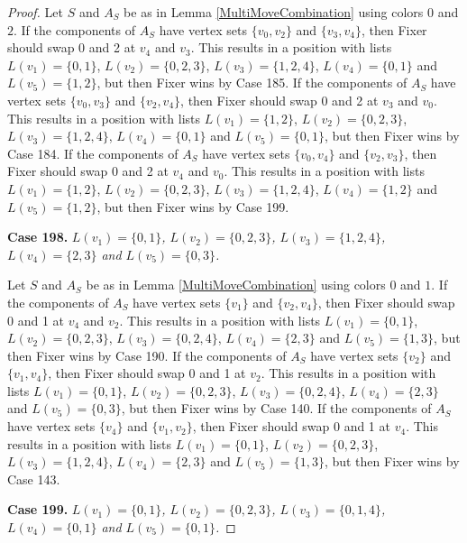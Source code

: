 \documentclass[12pt]{amsart}
\theoremstyle{plain}
\theoremstyle{definition}
\theoremstyle{remark}
\begin{document}
\begin{proof}
Let $S$ and $A_S$ be as in Lemma \ref{MultiMoveCombination} using colors $0$ and $2$. If the components of $A_S$ have vertex sets $\{v_0, v_2\}$ and $\{v_3, v_4\}$, then Fixer should swap 0 and 2 at $v_4$ and $v_3$. This results in a position with lists $L(v_1) = \{0, 1\}$, $L(v_2) = \{0, 2, 3\}$, $L(v_3) = \{1, 2, 4\}$, $L(v_4) = \{0, 1\}$ and $L(v_5) = \{1, 2\}$, but then Fixer wins by Case 185.
If the components of $A_S$ have vertex sets $\{v_0, v_3\}$ and $\{v_2, v_4\}$, then Fixer should swap 0 and 2 at $v_3$ and $v_0$. This results in a position with lists $L(v_1) = \{1, 2\}$, $L(v_2) = \{0, 2, 3\}$, $L(v_3) = \{1, 2, 4\}$, $L(v_4) = \{0, 1\}$ and $L(v_5) = \{0, 1\}$, but then Fixer wins by Case 184.
If the components of $A_S$ have vertex sets $\{v_0, v_4\}$ and $\{v_2, v_3\}$, then Fixer should swap 0 and 2 at $v_4$ and $v_0$. This results in a position with lists $L(v_1) = \{1, 2\}$, $L(v_2) = \{0, 2, 3\}$, $L(v_3) = \{1, 2, 4\}$, $L(v_4) = \{1, 2\}$ and $L(v_5) = \{1, 2\}$, but then Fixer wins by Case 199.

\noindent\textbf{Case 198.  }\textit{$L(v_1) = \{0, 1\}$, $L(v_2) = \{0, 2, 3\}$, $L(v_3) = \{1, 2, 4\}$, $L(v_4) = \{2, 3\}$ and $L(v_5) = \{0, 3\}$.}

Let $S$ and $A_S$ be as in Lemma \ref{MultiMoveCombination} using colors $0$ and $1$. If the components of $A_S$ have vertex sets $\{v_1\}$ and $\{v_2, v_4\}$, then Fixer should swap 0 and 1 at $v_4$ and $v_2$. This results in a position with lists $L(v_1) = \{0, 1\}$, $L(v_2) = \{0, 2, 3\}$, $L(v_3) = \{0, 2, 4\}$, $L(v_4) = \{2, 3\}$ and $L(v_5) = \{1, 3\}$, but then Fixer wins by Case 190.
If the components of $A_S$ have vertex sets $\{v_2\}$ and $\{v_1, v_4\}$, then Fixer should swap 0 and 1 at $v_2$. This results in a position with lists $L(v_1) = \{0, 1\}$, $L(v_2) = \{0, 2, 3\}$, $L(v_3) = \{0, 2, 4\}$, $L(v_4) = \{2, 3\}$ and $L(v_5) = \{0, 3\}$, but then Fixer wins by Case 140.
If the components of $A_S$ have vertex sets $\{v_4\}$ and $\{v_1, v_2\}$, then Fixer should swap 0 and 1 at $v_4$. This results in a position with lists $L(v_1) = \{0, 1\}$, $L(v_2) = \{0, 2, 3\}$, $L(v_3) = \{1, 2, 4\}$, $L(v_4) = \{2, 3\}$ and $L(v_5) = \{1, 3\}$, but then Fixer wins by Case 143.

\noindent\textbf{Case 199.  }\textit{$L(v_1) = \{0, 1\}$, $L(v_2) = \{0, 2, 3\}$, $L(v_3) = \{0, 1, 4\}$, $L(v_4) = \{0, 1\}$ and $L(v_5) = \{0, 1\}$.}


\end{proof}
\end{document}
